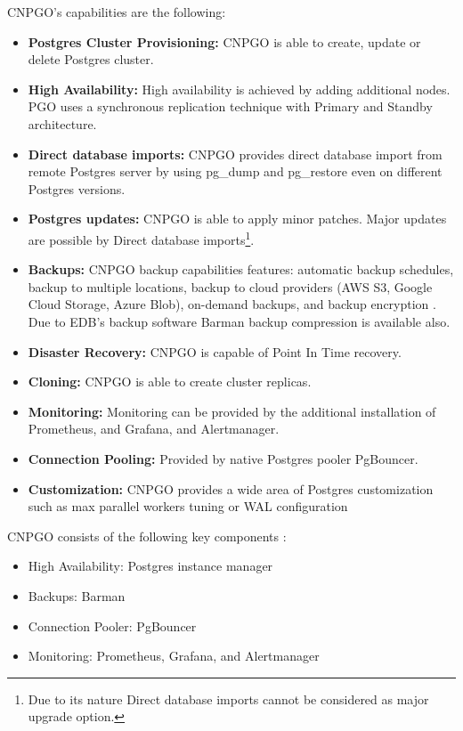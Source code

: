 CNPGO’s capabilities are the following:
\begin{itemize}
    \item \textbf{Postgres Cluster Provisioning:} CNPGO is able to create, update or delete Postgres cluster. \cite{CNPGdocuCapabilityLevels}
    \item \textbf{High Availability:} High availability is achieved by adding additional nodes. PGO uses a synchronous replication technique with Primary and Standby architecture. \cite{CNPGdocuReplication}
    \item \textbf{Direct database imports:} CNPGO provides direct database import from remote Postgres server by using pg\_dump and pg\_restore even on different Postgres versions. \cite{CNPGdocuDatabaseImports}
    \item \textbf{Postgres updates:} CNPGO is able to apply minor patches. \cite{CNPGdocuUpdates} Major updates are possible by Direct database imports\footnote[2]{Due to its nature Direct database imports cannot be considered as major upgrade option.}.
    \item \textbf{Backups:} CNPGO backup capabilities features: automatic backup schedules, backup to multiple locations, backup to cloud providers (AWS S3, Google Cloud Storage, Azure Blob), on-demand backups, and backup encryption \cite{CNPGdocuBackup}\cite{CNPGdocuTDE}. Due to EDB’s backup software Barman backup compression is available also. \cite{CNPGdocuBackup}
    \item \textbf{Disaster Recovery:} CNPGO is capable of Point In Time recovery. \cite{CNPGdocuBackup}
    \item \textbf{Cloning:} CNPGO is able to create cluster replicas. \cite{CNPGdocuReplication}
    \item \textbf{Monitoring:} Monitoring can be provided by the additional installation of Prometheus, and Grafana, and Alertmanager. \cite{CNPGdocuQuickstart}
    \item \textbf{Connection Pooling:} Provided by native Postgres pooler PgBouncer. \cite{CNPGdocuConnectionPooling}
    \item \textbf{Customization:} CNPGO provides a wide area of Postgres customization such as max parallel workers tuning or WAL configuration \cite{CNPGdocuConfiguration}
\end{itemize}

CNPGO consists of the following key components \cite{PostgresOnKubernetes} \cite{CNPGdocuQuickstart}:
\begin{itemize}
    \item High Availability: Postgres instance manager
    \item Backups: Barman
    \item Connection Pooler: PgBouncer
    \item Monitoring: Prometheus, Grafana, and Alertmanager
\end{itemize}

